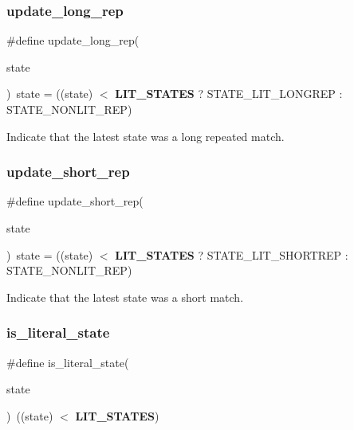 \subsubsection{update\+\_\+long\+\_\+rep}
{\footnotesize\ttfamily \#define update\+\_\+long\+\_\+rep(\begin{DoxyParamCaption}\item[{}]{state }\end{DoxyParamCaption})~state = ((state) $<$ \textbf{ L\+I\+T\+\_\+\+S\+T\+A\+T\+ES} ? S\+T\+A\+T\+E\+\_\+\+L\+I\+T\+\_\+\+L\+O\+N\+G\+R\+EP \+: S\+T\+A\+T\+E\+\_\+\+N\+O\+N\+L\+I\+T\+\_\+\+R\+EP)}



Indicate that the latest state was a long repeated match. 

\mbox{\label{lzma__common_8h_af249e4b787501e8a14ac344921662de5}} 
\subsubsection{update\+\_\+short\+\_\+rep}
{\footnotesize\ttfamily \#define update\+\_\+short\+\_\+rep(\begin{DoxyParamCaption}\item[{}]{state }\end{DoxyParamCaption})~state = ((state) $<$ \textbf{ L\+I\+T\+\_\+\+S\+T\+A\+T\+ES} ? S\+T\+A\+T\+E\+\_\+\+L\+I\+T\+\_\+\+S\+H\+O\+R\+T\+R\+EP \+: S\+T\+A\+T\+E\+\_\+\+N\+O\+N\+L\+I\+T\+\_\+\+R\+EP)}



Indicate that the latest state was a short match. 

\mbox{\label{lzma__common_8h_a36e3126576fdcc6041d647ab2c507050}} 
\subsubsection{is\+\_\+literal\+\_\+state}
{\footnotesize\ttfamily \#define is\+\_\+literal\+\_\+state(\begin{DoxyParamCaption}\item[{}]{state }\end{DoxyParamCaption})~((state) $<$ \textbf{ L\+I\+T\+\_\+\+S\+T\+A\+T\+ES})}



